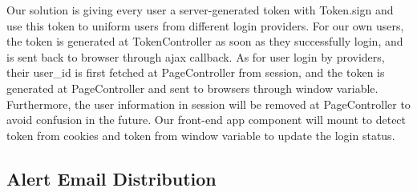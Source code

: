 Our solution is giving every user a server-generated token with 
Token.sign and use this token to uniform users from different 
login providers. For our own users, the token is generated at 
TokenController as soon as they successfully login, and is sent 
back to browser through ajax callback. As for user login by 
providers, their user\_id is first fetched at PageController 
from session, and the token is generated at PageController and 
sent to browsers through window variable. Furthermore, the user 
information in session will be removed at PageController to avoid 
confusion in the future. Our front-end app component will mount 
to detect token from cookies and token from window variable to 
update the login status.

\subsection{Alert Email Distribution}




